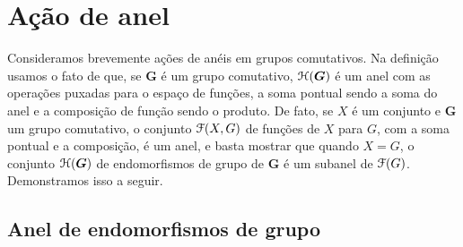 \section{Ação de anel}
\label{sec:aneis.acao}

Consideramos brevemente ações de anéis em grupos comutativos. Na definição usamos o fato de que, se $\bm G$ é um grupo comutativo, $\mathcal{H}(\bm G)$ é um anel com as operações puxadas para o espaço de funções, a soma pontual sendo a soma do anel e a composição de função sendo o produto. De fato, se $X$ é um conjunto e $\bm G$ um grupo comutativo, o conjunto $\mathcal{F}(X,G)$ de funções de $X$ para $G$, com a soma pontual e a composição, é um anel, e basta mostrar que quando $X=G$, o conjunto $\mathcal{H}(\bm G)$ de endomorfismos de grupo de $\bm G$ é um subanel de $\mathcal{F}(G)$.
Demonstramos isso a seguir.

\subsection{Anel de endomorfismos de grupo}

